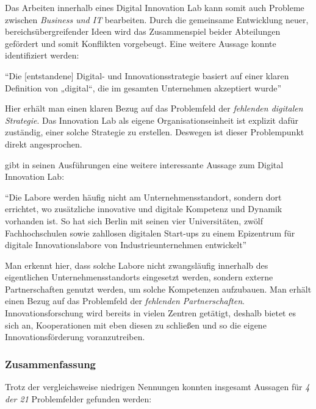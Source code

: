 Das Arbeiten innerhalb eines Digital Innovation Lab kann somit auch Probleme zwischen \textit{Business und IT} bearbeiten. Durch die gemeinsame Entwicklung neuer, bereichsübergreifender Ideen wird das Zusammenspiel beider Abteilungen gefördert und somit Konflikten vorgebeugt. Eine weitere Aussage konnte identifiziert werden:

\begin{center}
	``Die [entstandene] Digital- und Innovationsstrategie basiert auf einer klaren Definition von „digital“, die im gesamten Unternehmen akzeptiert wurde'' \cite[S. 259]{urbach_digitalization_2018}
\end{center}

Hier erhält man einen klaren Bezug auf das Problemfeld der \textit{fehlenden digitalen Strategie}. Das Innovation Lab als eigene Organisationseinheit ist explizit dafür zuständig, einer solche Strategie zu erstellen. Deswegen ist dieser Problempunkt direkt angesprochen.

 gibt in seinen Ausführungen eine weitere interessante Aussage zum Digital Innovation Lab:

\begin{center}
	``Die Labore werden häufig nicht am Unternehmensstandort, sondern dort errichtet, wo zusätzliche innovative und digitale Kompetenz und Dynamik vorhanden ist. So hat sich Berlin mit seinen vier Universitäten, zwölf Fachhochschulen sowie zahllosen digitalen Start-ups zu einem Epizentrum für digitale Innovationslabore von Industrieunternehmen entwickelt'' \cite[S. 183]{weinreich_lean_2016}
\end{center}

Man erkennt hier, dass solche Labore nicht zwangsläufig innerhalb des eigentlichen Unternehmensstandorts eingesetzt werden, sondern externe Partnerschaften genutzt werden, um solche Kompetenzen aufzubauen. Man erhält einen Bezug auf das Problemfeld der \textit{fehlenden Partnerschaften}. Innovationsforschung wird bereits in vielen Zentren getätigt, deshalb bietet es sich an, Kooperationen mit eben diesen zu schließen und so die eigene Innovationsförderung voranzutreiben.

\subsubsection{Zusammenfassung}

Trotz der vergleichsweise niedrigen Nennungen konnten insgesamt Aussagen für \textit{4 der 21} Problemfelder gefunden werden:

